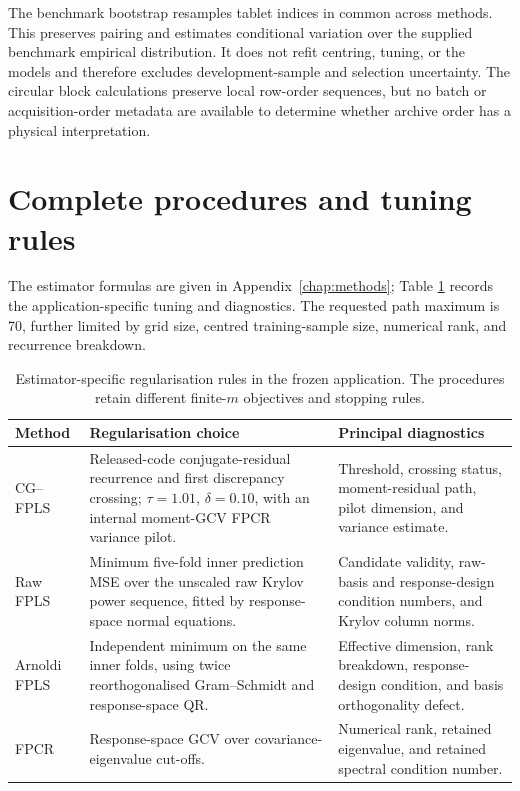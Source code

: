 The benchmark bootstrap resamples tablet indices in common across methods.
This preserves pairing and estimates conditional variation over the supplied
benchmark empirical distribution.  It does not refit centring, tuning, or the
models and therefore excludes development-sample and selection uncertainty.
The circular block calculations preserve local row-order sequences, but no
batch or acquisition-order metadata are available to determine whether archive
order has a physical interpretation.

\section{Complete procedures and tuning rules}
\label{sec:app-spectroscopy-tuning}

The estimator formulas are given in Appendix~\ref{chap:methods}; Table
\ref{tab:app-spectroscopy-procedures} records the application-specific tuning
and diagnostics.  The requested path maximum is 70, further limited by grid
size, centred training-sample size, numerical rank, and recurrence breakdown.

\begin{table}[htbp]
    \centering
    \small
    \caption[Regularisation rules in the empirical application]{Estimator-specific regularisation rules in the frozen application.
    The procedures retain different finite-$m$ objectives and stopping rules.}
    \label{tab:app-spectroscopy-procedures}
    \begin{tabular}{@{}
        >{\raggedright\arraybackslash}p{2.1cm}
        >{\raggedright\arraybackslash}p{6.2cm}
        >{\raggedright\arraybackslash}p{5.1cm}@{}}
        \toprule
        Method & Regularisation choice & Principal diagnostics \\
        \midrule
        CG--FPLS
          & Released-code conjugate-residual recurrence and first discrepancy
            crossing; $\tau=1.01$, $\delta=0.10$, with an internal moment-GCV
            FPCR variance pilot.
          & Threshold, crossing status, moment-residual path, pilot dimension,
            and variance estimate. \\
        Raw FPLS
          & Minimum five-fold inner prediction MSE over the unscaled raw Krylov
            power sequence, fitted by response-space normal equations.
          & Candidate validity, raw-basis and response-design condition numbers,
            and Krylov column norms. \\
        Arnoldi FPLS
          & Independent minimum on the same inner folds, using twice
            reorthogonalised Gram--Schmidt and response-space QR.
          & Effective dimension, rank breakdown, response-design condition,
            and basis orthogonality defect. \\
        FPCR
          & Response-space GCV over covariance-eigenvalue cut-offs.
          & Numerical rank, retained eigenvalue, and retained spectral
            condition number. \\
        \bottomrule
    \end{tabular}
\end{table}

